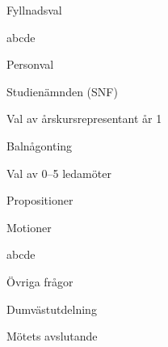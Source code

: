 \documentclass{sektionsmote}
\begin{document}
\begin{ootd}
\item{Fyllnadsval}
\begin{ootd}
    \item abcde
\end{ootd}

\item{Personval}
\begin{ootd}
    \item Studienämnden (SNF)
    \begin{ootd}
        \item Val av årskursrepresentant år 1
    \end{ootd}
    \item Balnågonting
    \begin{ootd}
        \item Val av 0--5 ledamöter
    \end{ootd}
\end{ootd}

\item{Propositioner}

\item{Motioner}
\begin{ootd}
    \item abcde
\end{ootd}

\item{Övriga frågor}

\item{Dumvästutdelning}

\item{Mötets avslutande}
\end{ootd}


\begin{bilagor}




\end{bilagor}
\end{document}
